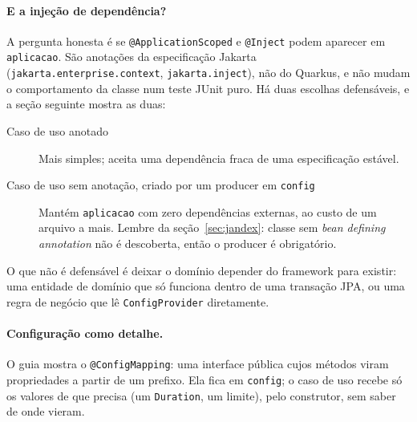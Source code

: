 \paragraph{E a injeção de dependência?}
A pergunta honesta é se \texttt{@ApplicationScoped} e \texttt{@Inject}
podem aparecer em \texttt{aplicacao}. São anotações da especificação
Jakarta (\texttt{jakarta.enterprise.context}, \texttt{jakarta.inject}),
não do Quarkus, e não mudam o comportamento da classe num teste JUnit
puro. Há duas escolhas defensáveis, e a seção seguinte mostra as duas:
\begin{description}
\item[Caso de uso anotado] Mais simples; aceita uma dependência fraca de
  uma especificação estável.
\item[Caso de uso sem anotação, criado por um producer em \texttt{config}]
  Mantém \texttt{aplicacao} com zero dependências externas, ao custo de
  um arquivo a mais. Lembre da seção~\ref{sec:jandex}: classe sem
  \emph{bean defining annotation} não é descoberta, então o producer é
  obrigatório.
\end{description}

O que não é defensável é deixar o domínio depender do framework para
existir: uma entidade de domínio que só funciona dentro de uma transação
JPA, ou uma regra de negócio que lê \texttt{ConfigProvider} diretamente.

\paragraph{Configuração como detalhe.}
O guia  mostra o
\texttt{@ConfigMapping}: uma interface pública cujos métodos viram
propriedades a partir de um prefixo. Ela fica em \texttt{config}; o caso
de uso recebe só os valores de que precisa (um \texttt{Duration}, um
limite), pelo construtor, sem saber de onde vieram.
